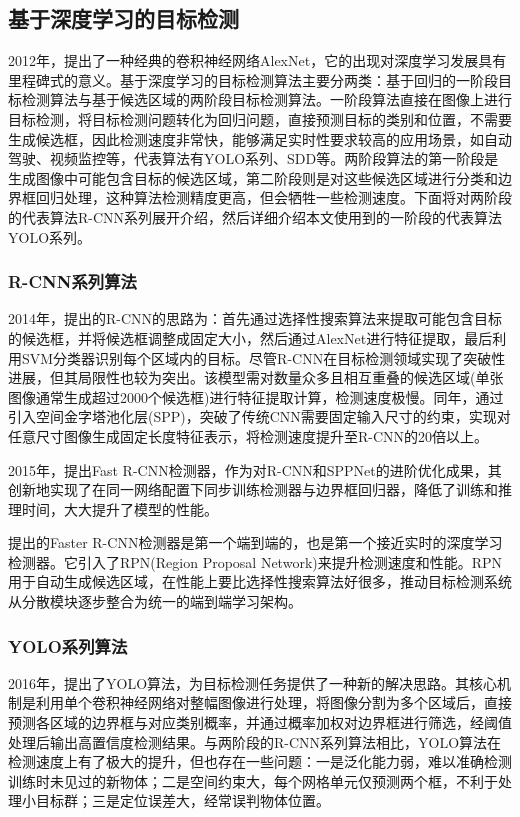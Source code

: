 \subsection{基于深度学习的目标检测}
2012年，\textcite{alexNet}提出了一种经典的卷积神经网络AlexNet，它的出现对深度学习发展具有里程碑式的意义。基于深度学习的目标检测算法主要分两类：基于回归的一阶段目标检测算法与基于候选区域的两阶段目标检测算法。一阶段算法直接在图像上进行目标检测，将目标检测问题转化为回归问题，直接预测目标的类别和位置，不需要生成候选框，因此检测速度非常快，能够满足实时性要求较高的应用场景，如自动驾驶、视频监控等，代表算法有YOLO系列、SDD等。两阶段算法的第一阶段是生成图像中可能包含目标的候选区域，第二阶段则是对这些候选区域进行分类和边界框回归处理，这种算法检测精度更高，但会牺牲一些检测速度。下面将对两阶段的代表算法R-CNN系列展开介绍，然后详细介绍本文使用到的一阶段的代表算法YOLO系列。

\subsubsection{R-CNN系列算法}
2014年，\textcite{rcnn}提出的R-CNN的思路为：首先通过选择性搜索\cite{selectSearch}算法来提取可能包含目标的候选框，并将候选框调整成固定大小，然后通过AlexNet进行特征提取，最后利用SVM分类器识别每个区域内的目标。尽管R-CNN在目标检测领域实现了突破性进展，但其局限性也较为突出。该模型需对数量众多且相互重叠的候选区域(单张图像通常生成超过2000个候选框)进行特征提取计算，检测速度极慢。同年，\textcite{sppnet}通过引入空间金字塔池化层(SPP)，突破了传统CNN需要固定输入尺寸的约束，实现对任意尺寸图像生成固定长度特征表示，将检测速度提升至R-CNN的20倍以上。

2015年，\textcite{fast-rcnn}提出Fast R-CNN检测器，作为对R-CNN和SPPNet的进阶优化成果，其创新地实现了在同一网络配置下同步训练检测器与边界框回归器，降低了训练和推理时间，大大提升了模型的性能。

\textcite{faster-rcnn}提出的Faster R-CNN检测器是第一个端到端的，也是第一个接近实时的深度学习检测器。它引入了RPN(Region Proposal Network)来提升检测速度和性能。RPN用于自动生成候选区域，在性能上要比选择性搜索算法好很多，推动目标检测系统从分散模块逐步整合为统一的端到端学习架构。

\subsubsection{YOLO系列算法}
2016年，\textcite{yolo}提出了YOLO算法，为目标检测任务提供了一种新的解决思路。其核心机制是利用单个卷积神经网络对整幅图像进行处理，将图像分割为多个区域后，直接预测各区域的边界框与对应类别概率，并通过概率加权对边界框进行筛选，经阈值处理后输出高置信度检测结果。与两阶段的R-CNN系列算法相比，YOLO算法在检测速度上有了极大的提升，但也存在一些问题：一是泛化能力弱，难以准确检测训练时未见过的新物体；二是空间约束大，每个网格单元仅预测两个框，不利于处理小目标群；三是定位误差大，经常误判物体位置。

